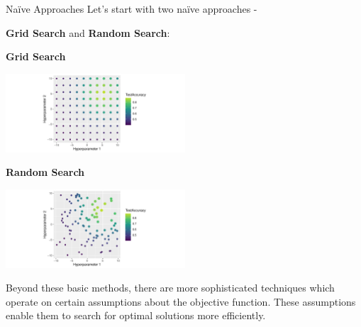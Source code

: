 \documentclass[11pt,compress,t,notes=noshow, xcolor=table]{beamer}
\begin{document}
\begin{vbframe}{Naïve Approaches}
Let's start with two naïve approaches -

\textbf{Grid Search} and \textbf{Random Search}:

\vspace{2em}
\begin{minipage}{0.51\textwidth}
\begin{center}
\textbf{Grid Search}
\end{center}

\includegraphics[width=190pt]{figure/cart_tuning_balgos_1.pdf}
\end{minipage}
\begin{minipage}{0.48\textwidth}
\begin{center}
\textbf{Random Search}
\end{center}

\includegraphics[width=190pt]{figure/cart_tuning_balgos_2.pdf}
\end{minipage}

\vspace{2em}
\small Beyond these basic methods, there are more sophisticated techniques which operate on certain assumptions about the objective function. These assumptions enable them to search for optimal solutions more efficiently.

\end{vbframe}
\end{document}
